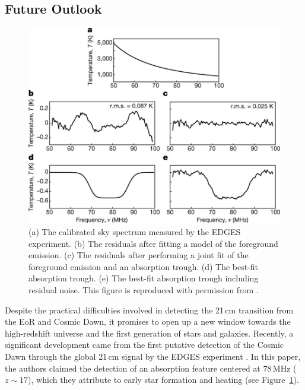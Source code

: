 \begin{bibunit}
\section{Future Outlook}\label{sec:intro-future-outlook}

\begin{figure}[t]
    \centering
    \includegraphics[width=\textwidth]{figures/chapter1/bowman-2018-absorption-trough}
    \caption{
        (a) The calibrated sky spectrum measured by the EDGES experiment.
        (b) The residuals after fitting a model of the foreground emission.
        (c) The residuals after performing a joint fit of the foreground emission and an absorption
        trough.
        (d) The best-fit absorption trough.
        (e) The best-fit absorption trough including residual noise.
        This figure is reproduced with permission from \citet{2018Natur.555...67B}.
    }
    \label{fig:bowman-absorption-trough}
\end{figure}

Despite the practical difficulties involved in detecting the 21\,cm transition from the EoR and
Cosmic Dawn, it promises to open up a new window towards the high-redshift universe and the first
generation of stars and galaxies.  Recently, a significant development came from the first putative
detection of the Cosmic Dawn through the global 21\,cm signal by the EDGES experiment
\citep{2018Natur.555...67B}. In this paper, the authors claimed the detection of an absorption
feature centered at $78\,\text{MHz}$ ($z\sim17$), which they attribute to early star formation and
heating (see Figure~\ref{fig:bowman-absorption-trough}).


\end{bibunit}

